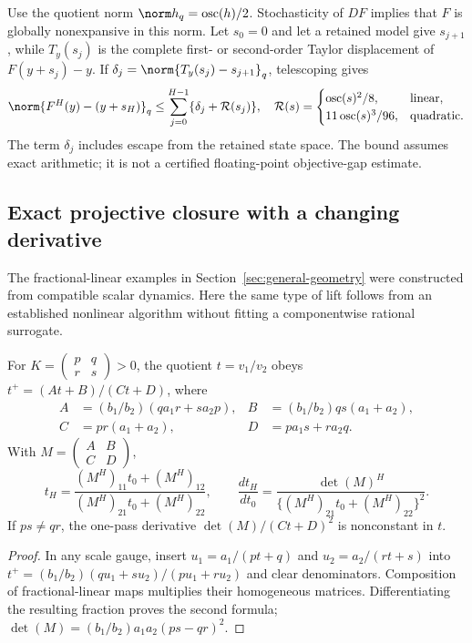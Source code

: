 Use the quotient norm $\norm h_q=\operatorname{osc}(h)/2$. Stochasticity
of $DF$ implies that $F$ is globally nonexpansive in this norm. Let $s_0=0$
and let a retained model give $s_{j+1}$, while $T_y(s_j)$ is the complete
first- or second-order Taylor displacement of $F(y+s_j)-y$. If
$\delta_j=\norm{T_y(s_j)-s_{j+1}}_q$, telescoping gives
\begin{equation}
 \norm{F^H(y)-(y+s_H)}_q
 \leq\sum_{j=0}^{H-1}\{\delta_j+\mathcal R(s_j)\},
 \quad
 \mathcal R(s)=
 \begin{cases}
  \operatorname{osc}(s)^2/8,&\text{linear},\\
  11\operatorname{osc}(s)^3/96,&\text{quadratic}.
 \end{cases}
 \label{eq:entropic-path-bound}
\end{equation}
The term $\delta_j$ includes escape from the retained state space. The
bound assumes exact arithmetic; it is not a certified floating-point
objective-gap estimate.

\subsection{Exact projective closure with a changing derivative}
The fractional-linear examples in Section~\ref{sec:general-geometry}
were constructed from compatible scalar dynamics. Here the same type of
lift follows from an established nonlinear algorithm without fitting a
componentwise rational surrogate.

\begin{proposition}
\label{prop:sinkhorn-projective}
For $K=\left(\begin{smallmatrix}p&q\\r&s\end{smallmatrix}\right)>0$,
the quotient $t=v_1/v_2$ obeys $t^+=(At+B)/(Ct+D)$, where
\begin{align*}
 A&=(b_1/b_2)(q a_1r+s a_2p),&
 B&=(b_1/b_2)qs(a_1+a_2),\\
 C&=pr(a_1+a_2),&D&=p a_1s+r a_2q.
\end{align*}
With $M=\left(\begin{smallmatrix}A&B\\C&D\end{smallmatrix}\right)$,
\begin{equation}
 t_H=\frac{(M^H)_{11}t_0+(M^H)_{12}}
              {(M^H)_{21}t_0+(M^H)_{22}},\qquad
 \frac{dt_H}{dt_0}=
 \frac{\det(M)^H}{\{(M^H)_{21}t_0+(M^H)_{22}\}^2}.
 \label{eq:sinkhorn-projective-power}
\end{equation}
If $ps\ne qr$, the one-pass derivative
$\det(M)/(Ct+D)^2$ is nonconstant in $t$.
\end{proposition}
\begin{proof}
In any scale gauge, insert
$u_1=a_1/(pt+q)$ and $u_2=a_2/(rt+s)$ into
$t^+=(b_1/b_2)(qu_1+su_2)/(pu_1+ru_2)$ and clear denominators.
Composition of fractional-linear maps multiplies their homogeneous
matrices. Differentiating the resulting fraction proves the second formula;
$\det(M)=(b_1/b_2)a_1a_2(ps-qr)^2$.
\end{proof}

